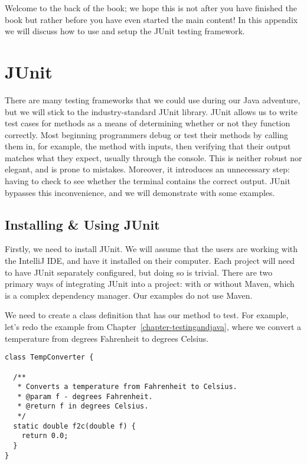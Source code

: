Welcome to the back of the book; we hope this is not after you have finished the book but rather before you have even started the main content! In this appendix we will discuss how to use and setup the JUnit testing framework.

\section*{JUnit}

There are many testing frameworks that we could use during our Java adventure, but we will stick to the industry-standard JUnit library. JUnit allows us to write test cases for methods as a means of determining whether or not they function correctly. Most beginning programmers debug or test their methods by calling them in, for example, the  method with inputs, then verifying that their output matches what they expect, usually through the console. This is neither robust nor elegant, and is prone to mistakes. Moreover, it introduces an unnecessary step: having to check to see whether the terminal contains the correct output. JUnit bypasses this inconvenience, and we will demonstrate with some examples.

\subsection*{Installing \& Using JUnit}

Firstly, we need to install JUnit. We will assume that the users are working with the IntelliJ IDE, and have it installed on their computer. Each project will need to have JUnit separately configured, but doing so is trivial. There are two primary ways of integrating JUnit into a project: with or without Maven, which is a complex dependency manager. Our examples do not use Maven.

We need to create a class definition that has our method to test. For example, let's redo the example from Chapter~\ref{chapter-testingandjava}, where we convert a temperature from degrees Fahrenheit to degrees Celsius.

\begin{cl}[]{}
\begin{lstlisting}[language=MyJava]
class TempConverter {

  /**
   * Converts a temperature from Fahrenheit to Celsius.
   * @param f - degrees Fahrenheit.
   * @return f in degrees Celsius.
   */
  static double f2c(double f) {
    return 0.0;
  }
}
\end{lstlisting}
\end{cl}

